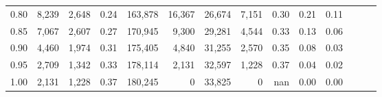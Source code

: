 \begin{tabular}{rrrrrrrrrrrrrr}
0.80 &   8,239 &  2,648 &  0.24 &  163,878 &   16,367 &  26,674 &   7,151 &  0.30 &  0.21 &      0.11 \\
0.85 &   7,067 &  2,607 &  0.27 &  170,945 &    9,300 &  29,281 &   4,544 &  0.33 &  0.13 &      0.06 \\
0.90 &   4,460 &  1,974 &  0.31 &  175,405 &    4,840 &  31,255 &   2,570 &  0.35 &  0.08 &      0.03 \\
0.95 &   2,709 &  1,342 &  0.33 &  178,114 &    2,131 &  32,597 &   1,228 &  0.37 &  0.04 &      0.02 \\
1.00 &   2,131 &  1,228 &  0.37 &  180,245 &        0 &  33,825 &       0 &   nan &  0.00 &      0.00 \\
\bottomrule
\end{tabular}

